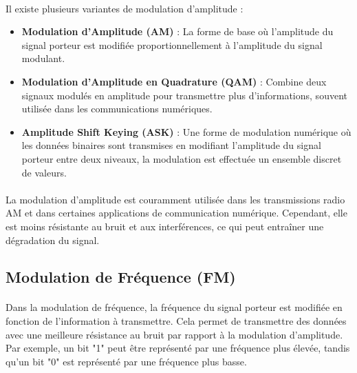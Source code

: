 \documentclass[a4paper,twocolumn]{report}
\begin{document}
\paragraph{}Il existe plusieurs variantes de modulation d'amplitude :
\begin{itemize}
    \item \textbf{Modulation d'Amplitude (AM)} : La forme de base où l'amplitude du signal porteur est modifiée proportionnellement à l'amplitude du signal modulant.
    \item \textbf{Modulation d'Amplitude en Quadrature (QAM)} : Combine deux signaux modulés en amplitude pour transmettre plus d'informations, souvent utilisée dans les communications numériques.
    \item \textbf{Amplitude Shift Keying (ASK)} : Une forme de modulation numérique où les données binaires sont transmises en modifiant l'amplitude du signal porteur entre deux niveaux, la modulation est effectuée un ensemble discret de valeurs.
\end{itemize}
\paragraph{}La modulation d'amplitude est couramment utilisée dans les transmissions radio AM et dans certaines applications de communication numérique. Cependant, elle est moins résistante au bruit et aux interférences, ce qui peut entraîner une dégradation du signal.

\subsection{Modulation de Fréquence (FM)}
\paragraph{}Dans la modulation de fréquence, la fréquence du signal porteur est modifiée en fonction de l'information à transmettre. Cela permet de transmettre des données avec une meilleure résistance au bruit par rapport à la modulation d'amplitude. Par exemple, un bit "1" peut être représenté par une fréquence plus élevée, tandis qu'un bit "0" est représenté par une fréquence plus basse. 
\end{document}
